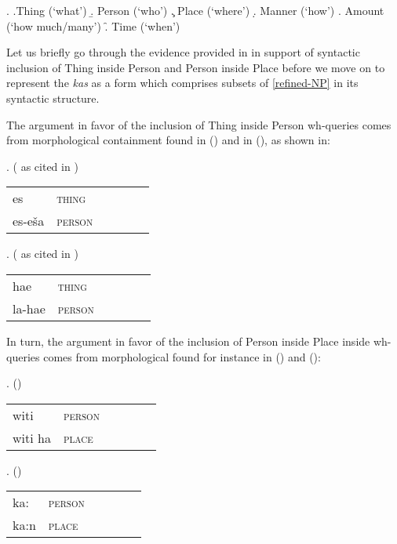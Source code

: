 \ex.\label{lightnouns} 
\a.Thing (`what')
\b. Person (`who')
\c. Place (`where')
\d. Manner (`how')
\e. Amount (`how much/many') 
\f. Time (`when')
 
\noindent 
Let us briefly go through the evidence provided in \cite{BaunazLanderTUM} in support of syntactic inclusion of Thing inside Person and Person inside Place  before we move on to represent the  \textit{kas} as a form which comprises subsets of \ref{refined-NP} in its syntactic structure. 
\par
The argument in favor of the inclusion of Thing inside Person wh-queries comes from morphological containment found in  () and in  (), as shown in:

\ex.  (\citealt[573]{Wise1986} as cited in \citealt{Cysouw2004})\\[0.25ex]
\begin{tabular}[t]{ l l l l l l }
es & \textsc{thing}\\
es-e\v{s}a  & \textsc{person}\\
\end{tabular}

\ex.  (\citealt[\S8.6.2]{VanDenBerg1989} as cited in \citealt{BaunazLanderTUM})\\[0.25ex]
\begin{tabular}[t]{ l l l l l l }
hae & \textsc{thing}\\
la-hae  & \textsc{person}\\
\end{tabular}

In turn, the argument in favor of the inclusion of Person inside Place inside wh-queries comes from morphological  found for instance in  () and  ():

\ex.  (\citealt[67, 70]{Borgman1990})\\[0.25ex]
\begin{tabular}[t]{ l l l l l l }
witi & \textsc{person}\\
witi ha  & \textsc{place}\\
\end{tabular}

\ex.  (\citealt[114]{Campbell1985})\\[0.25ex]
\begin{tabular}[t]{ l l l l l l }
ka: & \textsc{person}\\
ka:n  & \textsc{place}\\
\end{tabular}

